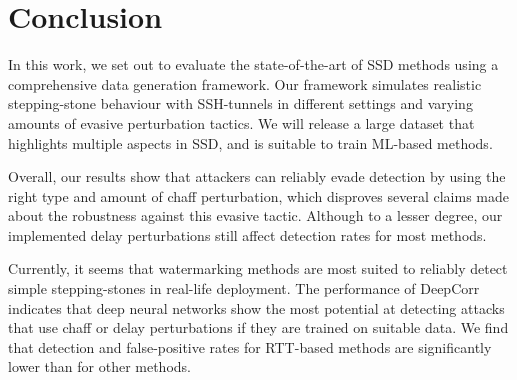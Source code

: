 \section{Conclusion}

In this work, we set out to evaluate the state-of-the-art of SSD methods using a comprehensive data generation framework. Our framework simulates realistic stepping-stone behaviour with SSH-tunnels in different  settings and varying amounts of evasive perturbation tactics. 
We will release a large dataset that highlights multiple aspects in SSD, and is suitable to train ML-based methods. 

Overall, our results show that attackers can reliably evade detection by using the right type and amount of chaff perturbation, which disproves several claims made about the robustness against this evasive tactic. Although to a lesser degree, our implemented delay perturbations still affect detection rates for most methods.%

Currently, it seems that watermarking methods are most suited to reliably detect simple stepping-stones in real-life deployment. The performance of DeepCorr indicates that deep neural networks show the most potential at detecting attacks that use chaff or delay perturbations if they are trained on suitable data. We find that detection and false-positive rates for RTT-based methods are significantly lower than for other methods.%

 

